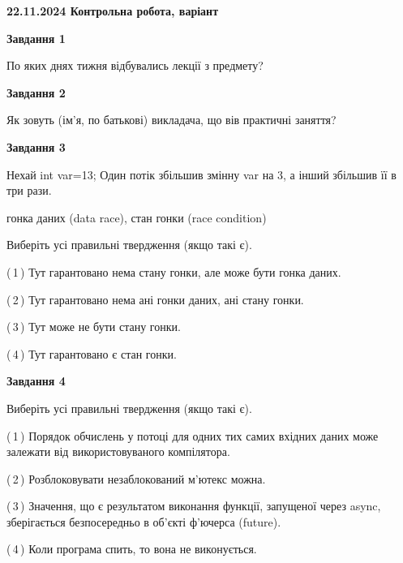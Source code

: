 \documentclass[12pt, ukrainian]{article}
\begin{document}
\begin {large}

\textbf{22.11.2024 Контрольна робота, варіант  }\par


{

\begin{center}
\textbf{Завдання 1}
\end{center}

По яких днях тижня відбувались лекції з предмету?


\begin{center}
\textbf{Завдання 2}
\end{center}

Як зовуть (ім'я, по батькові) викладача, що вів практичні заняття?


\begin{center}
\textbf{Завдання 3}
\end{center}

Нехай int var=13; Один потік збільшив змінну var на 3, а інший збільшив її в три рази.

гонка даних (data race), стан гонки (race condition)

Виберіть усі правильні твердження (якщо такі є).\par
\vspace{2mm}
(\,1\,) Тут гарантовано нема стану гонки, але може бути гонка даних.%

(\,2\,) Тут гарантовано нема ані гонки даних, ані стану гонки.%

(\,3\,) Тут може не бути стану гонки.%

(\,4\,) Тут гарантовано є стан гонки.%


\begin{center}
\textbf{Завдання 4}
\end{center}

Виберіть усі правильні твердження (якщо такі є).\par
\vspace{2mm}

(\,1\,) Порядок обчислень у потоці для одних тих самих вхідних даних може залежати від використовуваного компілятора.%

(\,2\,) Розблоковувати незаблокований м’ютекс можна.%

(\,3\,) Значення, що є результатом виконання функції, запущеної через async, зберігається безпосередньо в об’єкті ф’ючерса (future).%

(\,4\,) Коли програма спить, то вона не виконується.%


}
\end{large}
\end{document}
